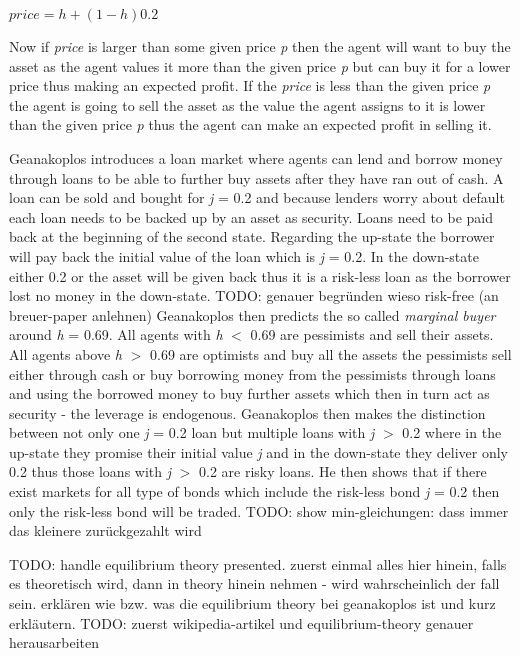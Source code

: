 \documentclass[../Bachelorarbeit.tex]{subfiles}
\begin{document}
\begin{center}
$price = h + (1 - h)0.2$
\end{center}

Now if \textit{price} is larger than some given price \textit{p} then the agent will want to buy the asset as the agent values it more than the given price \textit{p} but can buy it for a lower price thus making an expected profit. If the \textit{price} is less than the given price \textit{p} the agent is going to sell the asset as the value the agent assigns to it is lower than the given price \textit{p} thus the agent can make an expected profit in selling it.

\medskip
Geanakoplos introduces a loan market where agents can lend and borrow money through loans to be able to further buy assets after they have ran out of cash. A loan can be sold and bought for \textit{j} = 0.2 and because lenders worry about default each loan needs to be backed up by an asset as security. Loans need to be paid back at the beginning of the second state. Regarding the up-state the borrower will pay back the initial value of the loan which is \textit{j} = 0.2. In the down-state either 0.2 or the asset will be given back thus it is a risk-less loan as the borrower lost no money in the down-state. TODO: genauer begründen wieso risk-free (an breuer-paper anlehnen)
\linebreak
Geanakoplos then predicts the so called \textit{marginal buyer} around \textit{h} = 0.69. All agents with \textit{h} $<$ 0.69 are pessimists and sell their assets. All agents above \textit{h} $>$ 0.69 are optimists and buy all the assets the pessimists sell either through cash or buy borrowing money from the pessimists through loans and using the borrowed money to buy further assets which then in turn act as security - the leverage is endogenous.
\linebreak
Geanakoplos then makes the distinction between not only one \textit{j} = 0.2 loan but multiple loans with \textit{j} $>$ 0.2 where in the up-state they promise their initial value \textit{j} and in the down-state they deliver only 0.2 thus those loans with \textit{j} $>$ 0.2 are risky loans. He then shows that if there exist markets for all type of bonds which include the risk-less bond \textit{j} = 0.2 then only the risk-less bond will be traded. TODO: show min-gleichungen: dass immer das kleinere zurückgezahlt wird

\medskip

TODO: handle equilibrium theory presented. zuerst einmal alles hier hinein, falls es theoretisch wird, dann in theory hinein nehmen - wird wahrscheinlich der fall sein.
erklären wie bzw. was die equilibrium theory bei geanakoplos ist und kurz erkläutern.
TODO: zuerst wikipedia-artikel und equilibrium-theory genauer herausarbeiten
\end{document}
